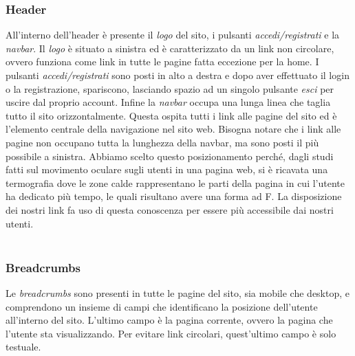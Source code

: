 \subsubsection{Header}
All’interno dell’header è presente il \textit{logo} del sito, i pulsanti \textit{accedi/registrati} e la \textit{navbar}.
Il \textit{logo} è situato a sinistra ed è caratterizzato da un link non circolare, ovvero funziona come link in tutte le pagine fatta eccezione per la home.
I pulsanti \textit{accedi/registrati} sono posti in alto a destra e dopo aver effettuato il login o la registrazione, spariscono, lasciando spazio ad un singolo pulsante \textit{esci} per uscire dal proprio account.
Infine la \textit{navbar} occupa una lunga linea che taglia tutto il sito orizzontalmente.
Questa ospita tutti i link alle pagine del sito ed è l’elemento centrale della navigazione nel sito web.
Bisogna notare che i link alle pagine non occupano tutta la lunghezza della navbar, ma sono posti il più possibile a sinistra.
Abbiamo scelto questo posizionamento perché, dagli studi fatti sul movimento oculare sugli utenti in una pagina web, si è ricavata una termograﬁa dove le zone calde rappresentano le parti della pagina in cui l’utente ha dedicato più tempo, le quali risultano avere una forma ad F.
La disposizione dei nostri link fa uso di questa conoscenza per essere più accessibile dai nostri utenti. \\ \\

\begin{center}
\end{center}


\subsubsection{Breadcrumbs}
Le \textit{breadcrumbs} sono presenti in tutte le pagine del sito, sia mobile che desktop, e comprendono un insieme di campi che identiﬁcano la posizione dell’utente all’interno del sito. L’ultimo campo è la pagina corrente, ovvero la pagina che l’utente sta visualizzando. Per evitare link circolari, quest’ultimo campo è solo testuale.

\begin{center}
\end{center}

